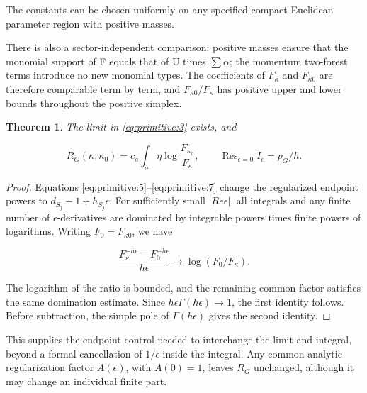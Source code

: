 \documentclass[11pt,a4paper,oneside]{article}
\theoremstyle{plain}
\newtheorem{theorem}{Theorem}[section]
\theoremstyle{definition}
\theoremstyle{remark}
\numberwithin{equation}{section}
\begin{document}
The constants can be chosen uniformly on any specified compact Euclidean parameter region with positive masses.

There is also a sector-independent comparison: positive masses ensure that the monomial support of F equals that of U times \(\sum \alpha \); the momentum two-forest terms introduce no new monomial types. The coefficients of \(F_\kappa \) and \(F_{\kappa 0}\) are therefore comparable term by term, and \(F_{\kappa 0}/F_\kappa \) has positive upper and lower bounds throughout the positive simplex.

\begin{theorem}

\label{thm:primitive:2.1} The limit in \eqref{eq:primitive:3} exists, and

\begin{equation}
R_G(\kappa,\kappa_0)=c_a\int_\sigma\eta
                            \log\frac{F_{\kappa_0}}{F_\kappa},
 \qquad \operatorname{Res}_{\epsilon=0}I_\epsilon=p_G/h.          \label{eq:primitive:8}
\end{equation}

\end{theorem}

\begin{proof}

Equations \eqref{eq:primitive:5}--\eqref{eq:primitive:7} change the regularized endpoint powers to \(d_{S_j}- 1+h_{S_j}\epsilon \). For sufficiently small \(|Re \epsilon |\), all integrals and any finite number of \(\epsilon \)-derivatives are dominated by integrable powers times finite powers of logarithms. Writing \(F_0=F_{\kappa 0}\), we have

\begin{equation}
\frac{F_\kappa^{-h\epsilon}-F_0^{-h\epsilon}}{h\epsilon}
                    \longrightarrow\log(F_0/F_\kappa).
\end{equation}

The logarithm of the ratio is bounded, and the remaining common factor satisfies the same domination estimate. Since \(h\epsilon \Gamma (h\epsilon )\to 1\), the first identity follows. Before subtraction, the simple pole of \(\Gamma (h\epsilon )\) gives the second identity.

\end{proof}

This supplies the endpoint control needed to interchange the limit and integral, beyond a formal cancellation of \(1/\epsilon \) inside the integral. Any common analytic regularization factor \(A(\epsilon )\), with \(A(0)=1\), leaves \(R_G\) unchanged, although it may change an individual finite part.
\end{document}
